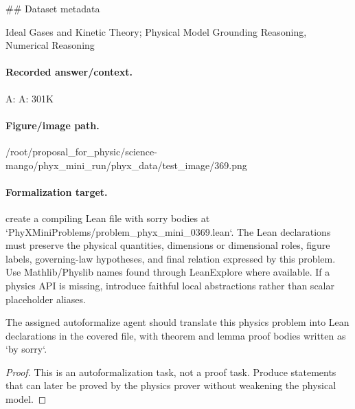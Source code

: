 \#\# Dataset metadata

Ideal Gases and Kinetic Theory; Physical Model Grounding Reasoning, Numerical Reasoning

\paragraph{Recorded answer/context.}
A: A: 301K

\paragraph{Figure/image path.}
/root/proposal\_for\_physic/science-mango/phyx\_mini\_run/phyx\_data/test\_image/369.png

\paragraph{Formalization target.}
create a compiling Lean file with sorry bodies at `PhyXMiniProblems/problem\_phyx\_mini\_0369.lean`. The Lean declarations must preserve the physical quantities, dimensions or dimensional roles, figure labels, governing-law hypotheses, and final relation expressed by this problem.
Use Mathlib/Physlib names found through LeanExplore where available. If a physics API is missing, introduce faithful local abstractions rather than scalar placeholder aliases.

\begin{theorem}
\label{thm:physics:phyx_mini_0369:target}
The assigned autoformalize agent should translate this physics problem into Lean declarations in the covered file, with theorem and lemma proof bodies written as `by sorry`.
\end{theorem}
\begin{proof}
This is an autoformalization task, not a proof task. Produce statements that can later be proved by the physics prover without weakening the physical model.
\end{proof}

